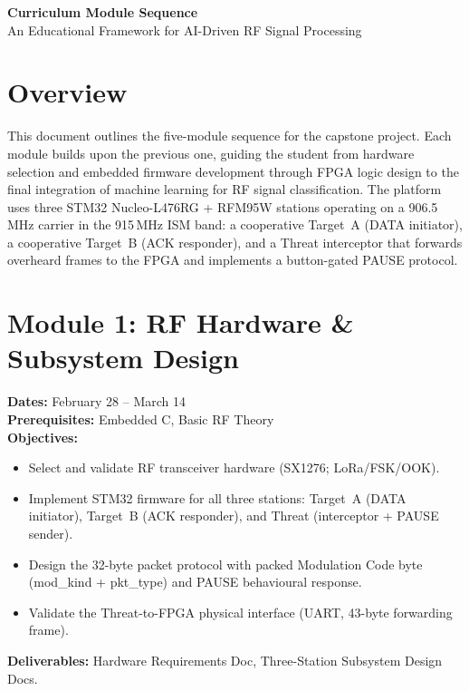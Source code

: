 \documentclass[11pt,letterpaper]{article}
\begin{document}
\begin{center}
    {\Huge\bfseries\color{stevens} Curriculum Module Sequence} \\[0.5em]
    {\Large\color{darkgray} An Educational Framework for AI-Driven RF Signal Processing}
\end{center}

\vspace{1em}

\section*{Overview}
This document outlines the five-module sequence for the capstone project. Each module builds upon the previous one, guiding the student from hardware selection and embedded firmware development through FPGA logic design to the final integration of machine learning for RF signal classification. The platform uses three STM32 Nucleo-L476RG + RFM95W stations operating on a 906.5\,MHz carrier in the 915\,MHz ISM band: a cooperative Target~A (DATA initiator), a cooperative Target~B (ACK responder), and a Threat interceptor that forwards overheard frames to the FPGA and implements a button-gated PAUSE protocol.

\section{Module 1: RF Hardware \& Subsystem Design}
\textbf{Dates:} February 28 -- March 14 \\
\textbf{Prerequisites:} Embedded C, Basic RF Theory \\
\textbf{Objectives:}
\begin{itemize}[noitemsep]
    \item Select and validate RF transceiver hardware (SX1276; LoRa/FSK/OOK).
    \item Implement STM32 firmware for all three stations: Target~A (DATA initiator), Target~B (ACK responder), and Threat (interceptor + PAUSE sender).
    \item Design the 32-byte packet protocol with packed Modulation Code byte (mod\_kind + pkt\_type) and PAUSE behavioural response.
    \item Validate the Threat-to-FPGA physical interface (UART, 43-byte forwarding frame).
\end{itemize}
\textbf{Deliverables:} Hardware Requirements Doc, Three-Station Subsystem Design Docs.
\end{document}
